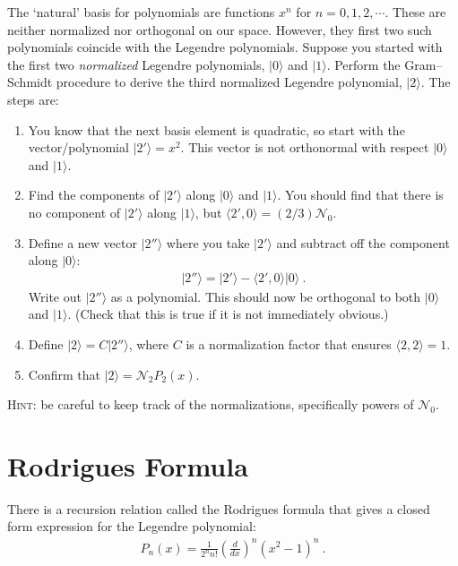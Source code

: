 \documentclass[12pt]{article}
\numberwithin{equation}{section}    %
\begin{document}
The `natural' basis for polynomials are functions $x^n$ for $n=0,1,2,\cdots$. These are neither normalized nor orthogonal on our space. However, they first two such polynomials coincide with the Legendre polynomials. Suppose you started with the first two \emph{normalized} Legendre polynomials, $|0\rangle$ and $|1\rangle$. Perform the Gram--Schmidt procedure to derive the third normalized Legendre polynomial, $|2\rangle$. The steps are:
\begin{enumerate}
\item You know that the next basis element is quadratic, so start with the vector/polynomial $|2'\rangle = x^2$. This vector is not orthonormal with respect $|0\rangle$ and $|1\rangle$. 
\item Find the components of $|2'\rangle$ along $|0\rangle$ and $|1\rangle$. You should find that there is no component of $|2'\rangle$ along $|1\rangle$, but $\langle 2', 0\rangle = (2/3)\mathcal N_0$. 
\item Define a new vector $|2''\rangle$ where you take $|2'\rangle$ and subtract off the component along $|0\rangle$:
\begin{align}
	|2''\rangle = |2'\rangle - \langle 2', 0\rangle |0\rangle \ .
\end{align}
Write out $|2''\rangle$ as a polynomial. This should now be orthogonal to both $|0\rangle$ and $|1\rangle$. (Check that this is true if it is not immediately obvious.)
\item Define  $|2\rangle = C|2''\rangle$, where $C$ is a normalization factor that ensures $\langle 2, 2 \rangle = 1$.
\item Confirm that $|2\rangle = \mathcal N_2 P_2(x)$. 
\end{enumerate}
\textsc{Hint:} be careful to keep track of the normalizations, specifically powers of $\mathcal N_0$.




\section{Rodrigues Formula}
There is a recursion relation called the Rodrigues formula that gives a closed form expression for the Legendre polynomial:
\begin{align}
	P_n(x) = \frac{1}{2^n n!} \left(\frac{d}{dx}\right)^n (x^2 - 1)^n \ .
\end{align}
\end{document}
